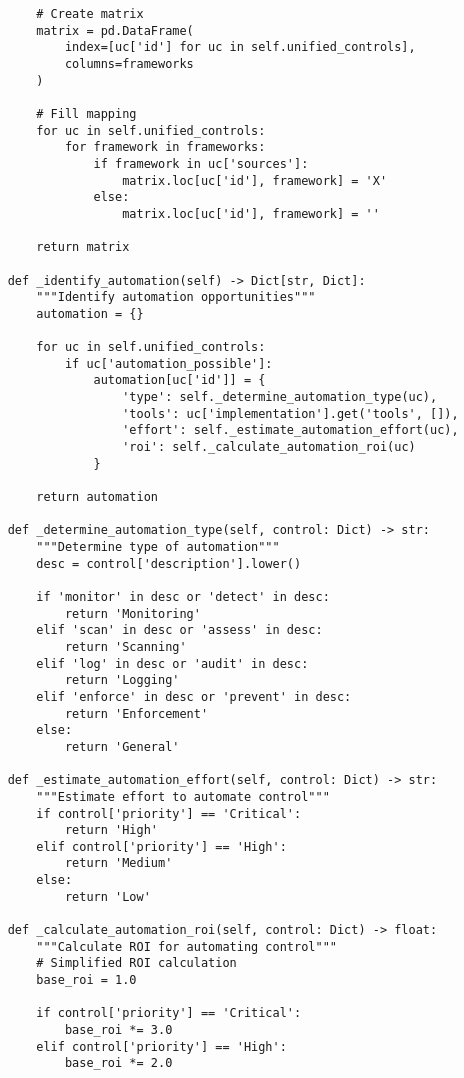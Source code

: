 \begin{verbatim}
        # Create matrix
        matrix = pd.DataFrame(
            index=[uc['id'] for uc in self.unified_controls],
            columns=frameworks
        )
        
        # Fill mapping
        for uc in self.unified_controls:
            for framework in frameworks:
                if framework in uc['sources']:
                    matrix.loc[uc['id'], framework] = 'X'
                else:
                    matrix.loc[uc['id'], framework] = ''
        
        return matrix
    
    def _identify_automation(self) -> Dict[str, Dict]:
        """Identify automation opportunities"""
        automation = {}
        
        for uc in self.unified_controls:
            if uc['automation_possible']:
                automation[uc['id']] = {
                    'type': self._determine_automation_type(uc),
                    'tools': uc['implementation'].get('tools', []),
                    'effort': self._estimate_automation_effort(uc),
                    'roi': self._calculate_automation_roi(uc)
                }
        
        return automation
    
    def _determine_automation_type(self, control: Dict) -> str:
        """Determine type of automation"""
        desc = control['description'].lower()
        
        if 'monitor' in desc or 'detect' in desc:
            return 'Monitoring'
        elif 'scan' in desc or 'assess' in desc:
            return 'Scanning'
        elif 'log' in desc or 'audit' in desc:
            return 'Logging'
        elif 'enforce' in desc or 'prevent' in desc:
            return 'Enforcement'
        else:
            return 'General'
    
    def _estimate_automation_effort(self, control: Dict) -> str:
        """Estimate effort to automate control"""
        if control['priority'] == 'Critical':
            return 'High'
        elif control['priority'] == 'High':
            return 'Medium'
        else:
            return 'Low'
    
    def _calculate_automation_roi(self, control: Dict) -> float:
        """Calculate ROI for automating control"""
        # Simplified ROI calculation
        base_roi = 1.0
        
        if control['priority'] == 'Critical':
            base_roi *= 3.0
        elif control['priority'] == 'High':
            base_roi *= 2.0
        

\end{verbatim}
